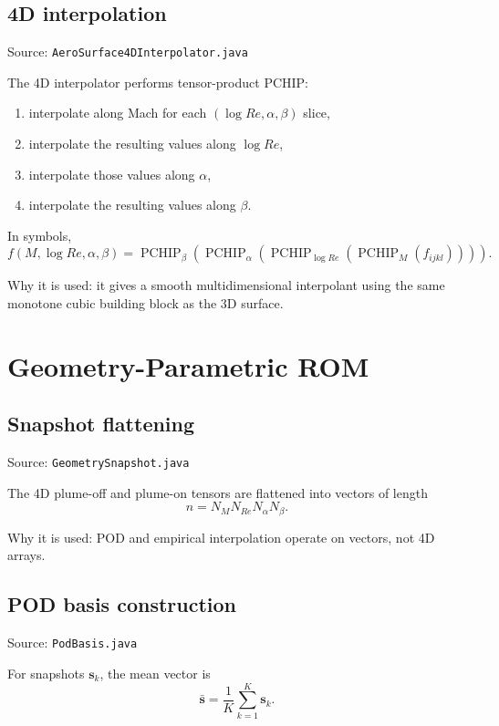 \documentclass[11pt]{article}
\begin{document}
\subsection{4D interpolation}
Source: \texttt{AeroSurface4DInterpolator.java}

The 4D interpolator performs tensor-product PCHIP:
\begin{enumerate}
\item interpolate along Mach for each $(\log Re,\alpha,\beta)$ slice,
\item interpolate the resulting values along $\log Re$,
\item interpolate those values along $\alpha$,
\item interpolate the resulting values along $\beta$.
\end{enumerate}

In symbols,
\begin{equation*}
f(M,\log Re,\alpha,\beta)
= \operatorname{PCHIP}_{\beta}\!\left(
\operatorname{PCHIP}_{\alpha}\!\left(
\operatorname{PCHIP}_{\log Re}\!\left(
\operatorname{PCHIP}_{M}(f_{ijkl})
\right)\right)\right).
\end{equation*}

Why it is used: it gives a smooth multidimensional interpolant using the same monotone cubic building block as the 3D surface.

\section{Geometry-Parametric ROM}
\subsection{Snapshot flattening}
Source: \texttt{GeometrySnapshot.java}

The 4D plume-off and plume-on tensors are flattened into vectors of length
\begin{equation*}
n = N_M N_{Re} N_{\alpha} N_{\beta}.
\end{equation*}

Why it is used: POD and empirical interpolation operate on vectors, not 4D arrays.

\subsection{POD basis construction}
Source: \texttt{PodBasis.java}

For snapshots $\mathbf s_k$, the mean vector is
\begin{equation*}
\bar{\mathbf s} = \frac{1}{K}\sum_{k=1}^{K}\mathbf s_k.
\end{equation*}
\end{document}
